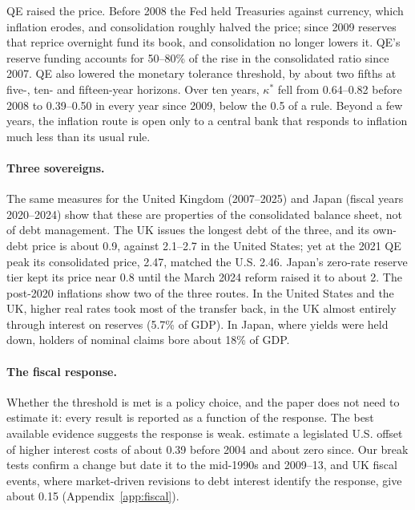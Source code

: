 QE raised the price. Before 2008 the Fed held Treasuries against currency, which inflation erodes, and consolidation roughly halved the price; since 2009 reserves that reprice overnight fund its book, and consolidation no longer lowers it. QE's reserve funding accounts for 50--80\% of the rise in the consolidated ratio since 2007. QE also lowered the monetary tolerance threshold, by about two fifths at five-, ten- and fifteen-year horizons. Over ten years, $\kappa^*$ fell from 0.64--0.82 before 2008 to 0.39--0.50 in every year since 2009, below the 0.5 of a \citet{taylor1993} rule. Beyond a few years, the inflation route is open only to a central bank that responds to inflation much less than its usual rule.

\paragraph{Three sovereigns.} The same measures for the United Kingdom (2007--2025) and Japan (fiscal years 2020--2024) show that these are properties of the consolidated balance sheet, not of debt management. The UK issues the longest debt of the three, and its own-debt price is about 0.9, against 2.1--2.7 in the United States; yet at the 2021 QE peak its consolidated price, 2.47, matched the U.S. 2.46. Japan's zero-rate reserve tier kept its price near 0.8 until the March 2024 reform raised it to about 2. The post-2020 inflations show two of the three routes. In the United States and the UK, higher real rates took most of the transfer back, in the UK almost entirely through interest on reserves (5.7\% of GDP). In Japan, where yields were held down, holders of nominal claims bore about 18\% of GDP.

\paragraph{The fiscal response.} Whether the threshold is met is a policy choice, and the paper does not need to estimate it: every result is reported as a function of the response. The best available evidence suggests the response is weak. \citet{auerbach2024} estimate a legislated U.S. offset of higher interest costs of about 0.39 before 2004 and about zero since. Our break tests confirm a change but date it to the mid-1990s and 2009--13, and UK fiscal events, where market-driven revisions to debt interest identify the response, give about 0.15 (Appendix~\ref{app:fiscal}).

